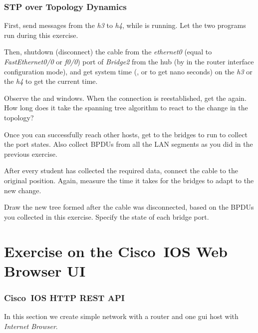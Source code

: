 \documentclass{../UTNetLab}
\begin{document}
\section{STP over Topology Dynamics}
First, send  messages from the \textit{h3} to \textit{h4}, while  is running.
Let the two programs run during this exercise.

Then, shutdown (disconnect) the cable from the \textit{ethernet0} (equal to \textit{FastEthernet0/0} or \textit{f0/0}) port of \textit{Bridge2} from the hub (by  in the router interface configuration mode), and get system time (,  or  to get nano seconds) on the \textit{h3} or the \textit{h4} to get the current time.

Observe the  and  windows.
When the connection is reestablished, get the  again.
How long does it take the spanning tree algorithm to react to the change in the topology?

Once you can successfully reach other hosts, get to the bridges to run  to collect the port states.
Also collect BPDUs from all the LAN segments as you did in the previous exercise.

After every student has collected the required data, connect the cable to the original position.
Again, measure the time it takes for the bridges to adapt to the new change.

\begin{report}
    \item Draw the new tree formed after the cable was disconnected, based on the BPDUs you collected in this exercise.
    Specify the state of each bridge port.
\end{report}

\part{Exercise on the Cisco~IOS Web Browser UI}
\section{Cisco~IOS HTTP REST API}
In this section we create simple network with a router and one gui host with \textit{Internet Browser}.
\end{document}
